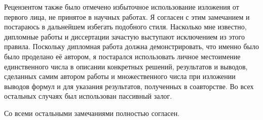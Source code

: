 \documentclass{trnotes}
\begin{document}
Рецензентом также было отмечено избыточное использование изложения от первого лица, не принятое в научных работах.
Я согласен с этим замечанием и постараюсь в дальнейшем избегать подобного стиля. 
Насколько мне известно, дипломные работы и диссертации зачастую выступают исключением из этого правила.
Поскольку дипломная работа должна демонстрировать, что именно было было проделано её автором, 
я постарался использовать личное местоимение единственного числа в описании конкретных решений, 
результатов и выводов, сделанных самим автором работы и множественного числа при
изложении выводов формул и для указания результатов, полученных в соавторстве. 
Во всех остальных случаях был использован пассивный залог.

Со всеми остальными замечаниями полностью согласен.
\end{document}
